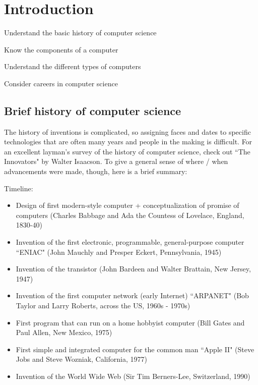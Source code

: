 \chapter{Introduction}

\begin{goals}
\item Understand the basic history of computer science
\item Know the components of a computer
\item Understand the different types of computers
\item Consider careers in computer science
\end{goals}

\section{Brief history of computer science}

The history of inventions is complicated, so assigning faces and dates to specific technologies that are often many years and people in the making is difficult. For an excellent layman's survey of the history of computer science, check out ``The Innovators" by Walter Isaacson. To give a general sense of where / when advancements were made, though, here is a brief summary: 

Timeline:
\begin{itemize}
\item Design of first modern-style computer + conceptualization of promise of computers (Charles Babbage and Ada the Countess of Lovelace, England, 1830-40)
\item Invention of the first electronic, programmable, general-purpose computer ``ENIAC" (John Mauchly and Presper Eckert, Pennsylvania, 1945)
\item Invention of the transistor (John Bardeen and Walter Brattain, New Jersey, 1947)
\item Invention of the first computer network (early Internet) ``ARPANET" (Bob Taylor and Larry Roberts, across the US, 1960s - 1970s)
\item First program that can run on a home hobbyist computer (Bill Gates and Paul Allen, New Mexico, 1975)
\item First simple and integrated computer for the common man ``Apple II" (Steve Jobs and Steve Wozniak, California, 1977)
\item Invention of the World Wide Web (Sir Tim Berners-Lee, Switzerland, 1990)
\end{itemize}

